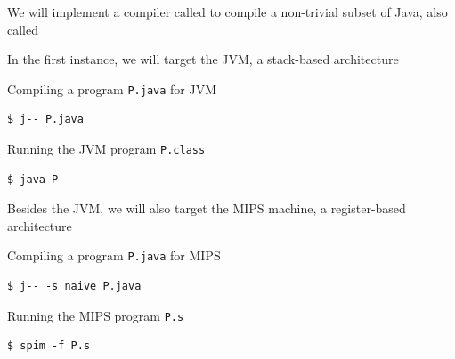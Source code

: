 \documentclass[8pt,a4paper,compress]{beamer}
\begin{document}
\begin{frame}[fragile]
\pause

We will implement a compiler called \jmm to compile a non-trivial subset of Java, also called \jmm

\pause\bigskip

In the first instance, we will target the JVM, a stack-based architecture

\pause\bigskip

Compiling a \jmm program \lstinline{P.java} for JVM
\begin{tcolorbox}[enhanced,drop shadow southwest,sharp corners,size=fbox,colback=black]
\begin{lstlisting}[style=terminal]
$ j-- P.java
\end{lstlisting}
\end{tcolorbox}

\pause\bigskip

Running the JVM program \lstinline{P.class}
\begin{tcolorbox}[enhanced,drop shadow southwest,sharp corners,size=fbox,colback=black]
\begin{lstlisting}[style=terminal]
$ java P
\end{lstlisting}
\end{tcolorbox}

\pause\bigskip

Besides the JVM, we will also target the MIPS machine, a register-based architecture

\pause\bigskip

Compiling a \jmm program \lstinline{P.java} for MIPS
\begin{tcolorbox}[enhanced,drop shadow southwest,sharp corners,size=fbox,colback=black]
\begin{lstlisting}[style=terminal]
$ j-- -s naive P.java
\end{lstlisting}
\end{tcolorbox}

\pause\bigskip

Running the MIPS program \lstinline{P.s}

\begin{tcolorbox}[enhanced,drop shadow southwest,sharp corners,size=fbox,colback=black]
\begin{lstlisting}[style=terminal]
$ spim -f P.s
\end{lstlisting}
\end{tcolorbox}
\end{frame}
\end{document}
